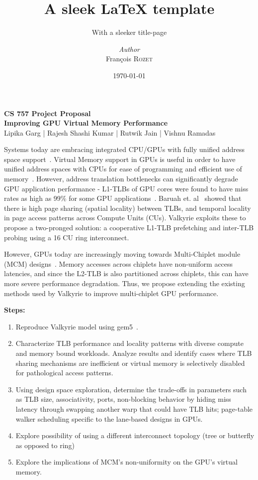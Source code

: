 \documentclass[a4paper, 12pt]{article}
\institute{Random University}
\title{A sleek \LaTeX{} template}
\subtitle{With a sleeker title-page}
\author{\textit{Author}\\François \textsc{Rozet}}
\date{\today}
\begin{document}
\begin{center}
{\bf CS 757 Project Proposal \\ Improving GPU Virtual Memory Performance}  \\
Lipika Garg | Rajesh Shashi Kumar | Rutwik Jain | Vishnu Ramadas
\end{center}

\noindent Systems today are embracing integrated CPU/GPUs with fully unified address space support~\cite{gpuvm}. Virtual Memory support in GPUs is useful in order to have unified address spaces with CPUs for ease of programming and efficient use of memory~\cite{gpuvm}. However, address translation bottlenecks can significantly degrade GPU application performance - L1-TLBs of GPU cores were found to have miss rates as high as 99\% for some GPU applications~\cite{valkyrie}. Baruah et. al~\cite{valkyrie} showed that there is high page sharing (spatial locality) between TLBs, and temporal locality in page access patterns across Compute Units (CUs). Valkyrie exploits these to propose a two-pronged solution: a cooperative L1-TLB prefetching and inter-TLB probing using a 16 CU ring interconnect.

However, GPUs today are increasingly moving towards Multi-Chiplet module (MCM) designs~\cite{mcm-gpu}. Memory accesses across chiplets have non-uniform access latencies, and since the L2-TLB is also partitioned across chiplets, this can have more severe performance degradation. Thus, we propose extending the existing methods used by Valkyrie to improve multi-chiplet GPU performance.

\textbf{Steps:}
\begin{enumerate}
    \item Reproduce Valkyrie model using gem5~\cite{sohi,valkyrie}.
    \item Characterize TLB performance and locality patterns with diverse compute and memory bound workloads. Analyze results and identify cases where TLB sharing mechanisms are inefficient or virtual memory is selectively disabled for pathological access patterns.
    \item Using design space exploration, determine the trade-offs in parameters such as TLB size, associativity, ports, non-blocking behavior by hiding miss latency through swapping another warp that could have TLB hits; page-table walker scheduling specific to the lane-based designs in GPUs. 
    \item Explore possibility of using a different interconnect topology (tree or butterfly as opposed to ring)
    \item  Explore the implications of MCM’s non-uniformity on the GPU’s virtual memory.  %
\end{enumerate}
\end{document}
